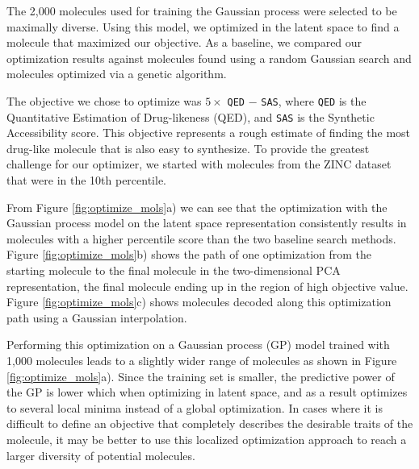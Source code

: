 \documentclass[journal=acscii,manuscript=article]{achemso}
\begin{document}
The 2,000 molecules used for training the Gaussian process were selected to be maximally diverse. Using this model, we optimized in the latent space to find a molecule that maximized our objective. As a baseline, we compared our optimization results against molecules found using a random Gaussian search and molecules optimized via a genetic algorithm.

The objective we chose to optimize was $5 \times$ \texttt{QED} $-$ \texttt{SAS}, where \texttt{QED} is the Quantitative Estimation of Drug-likeness (QED)\cite{bickerton2012quantifying}, and \texttt{SAS} is the Synthetic Accessibility score\cite{Ertl2009estimation}. This objective represents a rough estimate of finding the most drug-like molecule that is also easy to synthesize. To provide the greatest challenge for our optimizer, we started with molecules from the ZINC dataset that  were in the 10th percentile.

From Figure \ref{fig:optimize_mols}a) we can see that the optimization with the Gaussian process model on the latent space representation consistently results in molecules with a higher percentile score than the two baseline search methods. Figure \ref{fig:optimize_mols}b) shows the path of one optimization from the starting molecule to the final molecule in the two-dimensional PCA representation, the final molecule ending up in the region of high objective value. Figure \ref{fig:optimize_mols}c)  shows molecules decoded along this optimization path using a Gaussian interpolation.

Performing this optimization on a Gaussian process (GP) model trained with 1,000 molecules leads to a slightly wider range of molecules as shown in Figure \ref{fig:optimize_mols}a). 
  Since the training set is smaller, the predictive power of the GP is lower which when optimizing in latent space, and as a result optimizes to several local minima instead of a global optimization.  In cases where it is difficult to define an objective that completely describes the desirable traits of the molecule, it may be better to use this localized optimization approach to reach a larger diversity of potential molecules.
\end{document}
